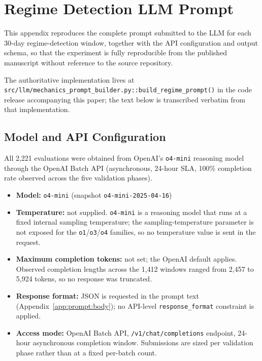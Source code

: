 
\appendix

\section[Regime Detection LLM Prompt]{Regime Detection LLM Prompt}
\label{app:prompt}

This appendix reproduces the complete prompt submitted to the LLM for
each 30-day regime-detection window, together with the API configuration
and output schema, so that the experiment is fully reproducible from the
published manuscript without reference to the source repository.

The authoritative implementation lives at
\texttt{src/llm/mechanics\_prompt\_builder.py::build\_regime\_prompt()}
in the code release accompanying this paper; the text below is
transcribed verbatim from that implementation.

\subsection{Model and API Configuration}
\label{app:prompt:config}

All 2{,}221 evaluations were obtained from OpenAI's \texttt{o4-mini}
reasoning model through the OpenAI Batch API (asynchronous, 24-hour SLA,
100\% completion rate observed across the five validation phases).

\begin{itemize}
    \item \textbf{Model:} \texttt{o4-mini} (snapshot
          \texttt{o4-mini-2025-04-16})
    \item \textbf{Temperature:} not supplied. \texttt{o4-mini} is a
          reasoning model that runs at a fixed internal sampling
          temperature; the sampling-temperature parameter is not
          exposed for the \texttt{o1}/\texttt{o3}/\texttt{o4} families,
          so no temperature value is sent in the request.
    \item \textbf{Maximum completion tokens:} not set; the OpenAI
          default applies. Observed completion lengths across the
          1{,}412 windows ranged from 2{,}457 to 5{,}924 tokens, so
          no response was truncated.
    \item \textbf{Response format:} JSON is requested in the prompt
          text (Appendix~\ref{app:prompt:body}); no API-level
          \texttt{response\_format} constraint is applied.
    \item \textbf{Access mode:} OpenAI Batch API,
          \texttt{/v1/chat/completions} endpoint, 24-hour asynchronous
          completion window. Submissions are sized per validation
          phase rather than at a fixed per-batch count.
\end{itemize}

